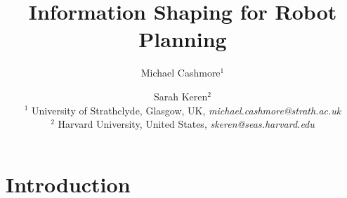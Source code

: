 \documentclass[letterpaper]{article}
\begin{document}
\title{Information Shaping for Robot Planning}
\author{
Michael Cashmore$^{1}$ \and Sarah Keren$^{2}$\\
$^{1}$ University of Strathclyde, Glasgow, UK, \textit{michael.cashmore@strath.ac.uk}\\
$^{2}$ Harvard University, United States, \textit{skeren@seas.harvard.edu}
}

\maketitle



\section{Introduction}
\end{document}
